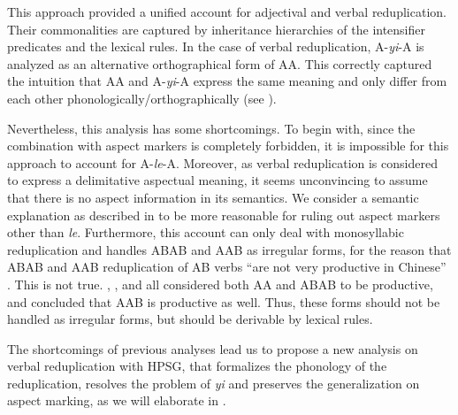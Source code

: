 This approach provided a unified account for adjectival and verbal reduplication.
Their commonalities are captured by inheritance hierarchies of the intensifier predicates and the lexical rules.
In the case of verbal reduplication, A-\textit{yi}-A is analyzed as an alternative orthographical form of AA.
This correctly captured the intuition that AA and A-\textit{yi}-A express the same meaning and only differ from each other phonologically/orthographically (see ).

Nevertheless, this analysis has some shortcomings.
To begin with, since the combination with aspect markers is completely forbidden, it is impossible for this approach to account for A\hyp{}\textit{le}\hyp{}A.
Moreover, as verbal reduplication is  considered to express a delimitative aspectual meaning,
it seems unconvincing to assume that there is no aspect information in its semantics.
We consider a semantic explanation as described in   to be more reasonable for ruling out aspect markers other than \textit{le}.
Furthermore, this account can only deal with monosyllabic reduplication and handles ABAB and AAB as irregular forms, for the reason that ABAB and AAB reduplication of AB verbs ``are not very productive in Chinese'' \citep[102]{FanSongBond2015}.
This is not true. 
\citet{BascianoMelloni2017}, \citet{MelloniBasciano2018},  \citet{Xing2000stat} and  \citet{Xie2020}  all considered both AA and ABAB to be productive,
and \citet{Xing2000stat} concluded that AAB is productive as well.
Thus, these forms should not be handled as  irregular forms, but should be derivable by lexical rules.


 
 


The shortcomings of previous analyses lead us to propose a new analysis on verbal reduplication with {HPSG}, 
that formalizes the phonology of the reduplication, resolves the problem of \textit{yi} and preserves the generalization on aspect marking, 
as we will elaborate in . 